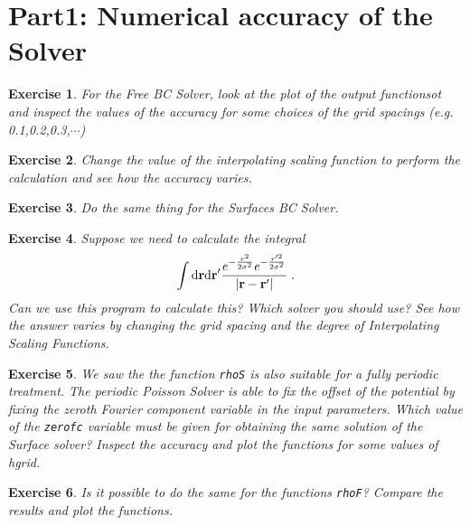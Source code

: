 \documentclass[a4paper]{article}
\newcommand{\dd}{{\rm d}}
\newcommand{\be}{\begin{equation}}
\newcommand{\ee}{\end{equation}}
\newtheorem{exercise}{Exercise}
\begin{document}
\clearpage
\section*{Part1: Numerical accuracy of the Solver}
\begin{exercise}
For the Free BC Solver, look at the plot of the output functionsot and inspect the values of the accuracy for some choices of the grid spacings (e.g. 0.1,0.2,0.3,$\cdots$)
\end{exercise}
\begin{exercise}
Change the value of the interpolating scaling function to perform the calculation and see how the accuracy varies.
\end{exercise}
\begin{exercise}
Do the same thing for the Surfaces BC Solver.
\end{exercise}
\begin{exercise}
Suppose we need to calculate the integral
\be
\int \dd \mathbf{r} \dd \mathbf{r}' \frac{e^{-\frac{r^2}{2 \sigma^2}} e^{-\frac{r'^2}{2 \sigma^2}} }{|\mathbf{r} - \mathbf{r}'|}\;.
\ee
Can we use this program to calculate this? Which solver you should use? See how the answer varies by changing the grid spacing and the degree of Interpolating Scaling Functions.	
\end{exercise}
\begin{exercise}
We saw the the function \texttt{rhoS} is also suitable for a fully periodic treatment. The periodic Poisson Solver is able to fix the offset of the potential by fixing the zeroth Fourier component variable in the input parameters.
Which value of the \texttt{zerofc} variable must be given for obtaining the same solution of the Surface solver? Inspect the accuracy and plot the functions for some values of hgrid.
\end{exercise}
\begin{exercise}
Is it possible to do the same for the functions \texttt{rhoF}? Compare the results and plot the functions.
\end{exercise}
\clearpage
\end{document}
